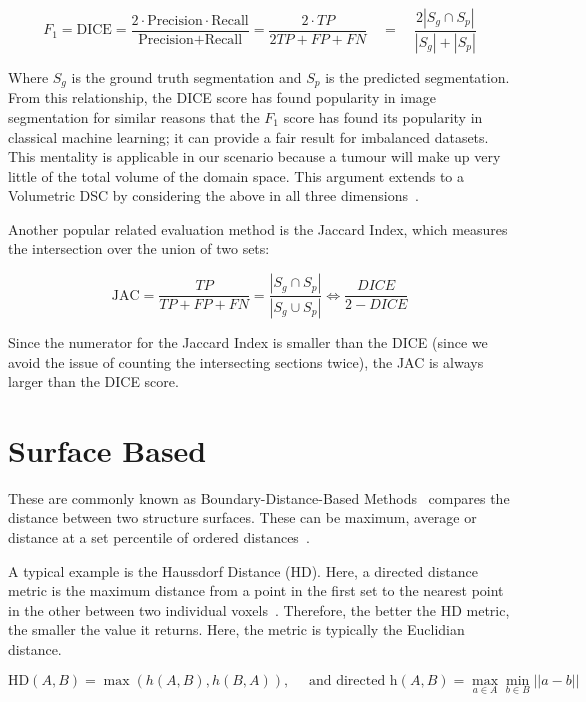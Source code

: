 \documentclass[11pt,twoside]{report}
\begin{document}
\begin{equation*}
 F_1 = \text{DICE} = \frac{2 \cdot \text{Precision} \cdot \text{Recall}} {\text{Precision} + \text{Recall}} = \frac{2 \cdot TP}{2TP + FP + FN} \quad = \quad \frac{2|S_g\cap S_p|}{|S_g|+|S_p|}
\end{equation*}

Where $S_g$ is the ground truth segmentation and $S_p$ is the predicted segmentation. From this relationship, the DICE score has found popularity in image segmentation for similar reasons that the $F_1$ score has found its popularity in classical machine learning; it can provide a fair result for imbalanced datasets. This mentality is applicable in our scenario because a tumour will make up very little of the total volume of the domain space. This argument extends to a Volumetric DSC by considering the above in all three dimensions~\cite{APL}. 

Another popular related evaluation method is the Jaccard Index, which measures the intersection over the union of two sets:

\begin{equation*}
 \text{JAC} = \frac{TP}{TP+FP+FN} = \frac{|S_g\cap S_p|}{|S_g \cup S_p|} \iff \frac{DICE}{2 - DICE}
\end{equation*}

Since the numerator for the Jaccard Index is smaller than the DICE (since we avoid the issue of counting the intersecting sections twice), the JAC is always larger than the DICE score.

\section{Surface Based}\label{sect:surface-based}

These are commonly known as Boundary-Distance-Based Methods~\cite{boundary-overlap-metrics} compares the distance between two structure surfaces. These can be maximum, average or distance at a set percentile of ordered distances~\cite{evaluation-metrics}.

A typical example is the Haussdorf Distance (HD). Here, a directed distance metric is the maximum distance from a point in the first set to the nearest point in the other between two individual voxels~\cite{boundary-overlap-metrics}. Therefore, the better the HD metric, the smaller the value it returns. Here, the metric is typically the Euclidian distance.

\begin{equation*}
 \text{HD}(A,B) = \max(h(A,B), h(B,A)), \quad \text{ and directed h}(A,B)=\max_{a\in A}\min_{b \in B} ||a-b||
\end{equation*}
\end{document}
